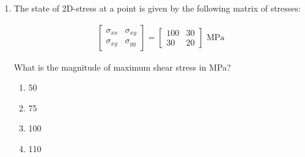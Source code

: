 \documentclass[journal,12pt,onecolumn]{IEEEtran}
\theoremstyle{remark}
\begin{document}
\begin{enumerate}
    \begin{multicols}{2}
    \begin{enumerate}
        \item 30$\degree$
        \item 150$\degree$
        \item 210$\degree$
        \item 330$\degree$
    \end{enumerate}
    \end{multicols}

  

\item The state of 2D-stress at a point is given by the following matrix of stresses:

\begin{align*}
    \begin{bmatrix}
\sigma_{xx} & \sigma_{xy} \\
\sigma_{xy} & \sigma_{yy}
\end{bmatrix}
=
\begin{bmatrix}
100 & 30 \\
30 & 20
\end{bmatrix} \text{ MPa}
\end{align*}


What is the magnitude of maximum shear stress in MPa?
\begin{multicols}{4}
\begin{enumerate}
    \item 50
    \item 75
    \item 100
    \item110
\end{enumerate}
\end{multicols}


\end{enumerate}
\end{document}
